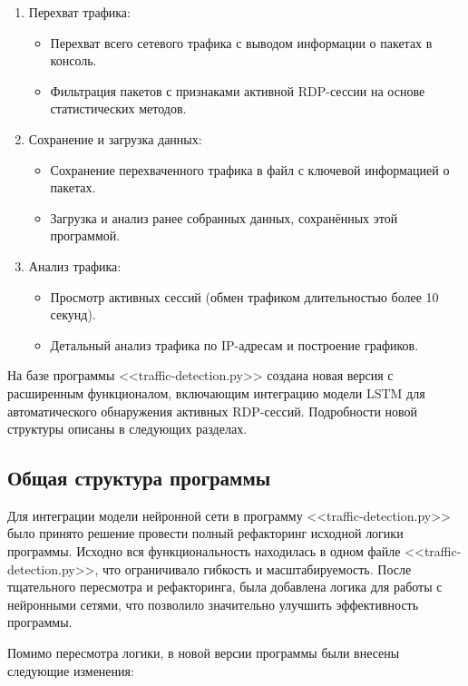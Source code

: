 \documentclass[bachelor, och, coursework]{SCWorks}
\begin{document}
\begin{enumerate}
  \item Перехват трафика:
  
  \begin{itemize}
    \item Перехват всего сетевого трафика с выводом информации о пакетах в консоль.
    \item Фильтрация пакетов с признаками активной RDP-сессии на основе статистических методов.
  \end{itemize}
  \item Сохранение и загрузка данных:
  \begin{itemize}
    \item Сохранение перехваченного трафика в файл с ключевой информацией о пакетах.
    \item Загрузка и анализ ранее собранных данных, сохранённых этой программой.
  \end{itemize}
  \item Анализ трафика:
  \begin{itemize}
    \item Просмотр активных сессий (обмен трафиком длительностью более 10 секунд).
    \item Детальный анализ трафика по IP-адресам и построение графиков.
  \end{itemize}

\end{enumerate}

  На базе программы <<traffic-detection.py>> создана новая версия с расширенным функционалом, включающим интеграцию модели 
  LSTM для автоматического обнаружения активных RDP-сессий. Подробности новой структуры описаны в следующих разделах.

\subsection{Общая структура программы}

Для интеграции модели нейронной сети в программу <<traffic-detection.py>> было принято решение провести полный рефакторинг исходной логики программы. 
Исходно вся функциональность находилась в одном файле <<traffic-detection.py>>, что ограничивало гибкость и масштабируемость. После тщательного 
пересмотра и рефакторинга, была добавлена логика для работы с нейронными сетями, что позволило значительно улучшить эффективность программы.

Помимо пересмотра логики, в новой версии программы были внесены следующие изменения:
\end{document}
